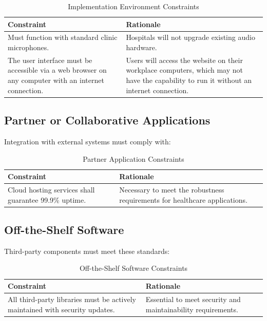 \documentclass[12pt]{article}
\begin{document}
\begin{table}[H]
\centering
\begin{tabular}{|p{6cm}|p{6cm}|}
\hline
\textbf{Constraint} & \textbf{Rationale} \\
\hline
Must function with standard clinic microphones. & Hospitals will not upgrade existing audio hardware. \\
\hline
The user interface must be accessible via a web browser on any computer with an internet connection. & Users will access the website on their workplace computers, which may not have the capability to run it without an internet connection. \\
\hline
\end{tabular}
\caption{Implementation Environment Constraints}
\label{tab:implementation_constraints}
\end{table}

\subsection{Partner or Collaborative Applications}
Integration with external systems must comply with:

\begin{table}[H]
\centering
\begin{tabular}{|p{6cm}|p{6cm}|}
\hline
\textbf{Constraint} & \textbf{Rationale} \\
\hline
Cloud hosting services shall guarantee 99.9\% uptime. & Necessary to meet the robustness requirements for healthcare applications. \\
\hline
\end{tabular}
\caption{Partner Application Constraints}
\label{tab:partner_constraints}
\end{table}

\subsection{Off-the-Shelf Software}
Third-party components must meet these standards:

\begin{table}[H]
\centering
\begin{tabular}{|p{6cm}|p{6cm}|}
\hline
\textbf{Constraint} & \textbf{Rationale} \\
\hline
All third-party libraries must be actively maintained with security updates. & Essential to meet security and maintainability requirements. \\
\hline
\end{tabular}
\caption{Off-the-Shelf Software Constraints}
\label{tab:off_the_shelf_constraints}
\end{table}
\end{document}
